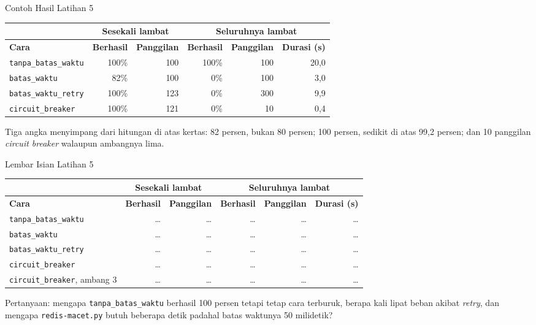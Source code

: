 \documentclass[aspectratio=169, table, 12pt]{beamer}
\begin{document}
\begin{frame}{{\Large Contoh Hasil Latihan 5}}
  \vspace{6pt}
  \centering
  {\small
  \begin{tabularx}{\textwidth}{Xrrrrr}
    \hline
     & \multicolumn{2}{c}{\textbf{Sesekali lambat}} & \multicolumn{3}{c}{\textbf{Seluruhnya lambat}} \\
    \hline
    \textbf{Cara} & \textbf{Berhasil} & \textbf{Panggilan} & \textbf{Berhasil} & \textbf{Panggilan} & \textbf{Durasi (s)} \\
    \hline
    \texttt{tanpa\_batas\_waktu} & 100\% & 100 & 100\% & 100 & 20,0 \\
    \hline
    \texttt{batas\_waktu} & 82\% & 100 & 0\% & 100 & 3,0 \\
    \hline
    \texttt{batas\_waktu\_retry} & 100\% & 123 & 0\% & 300 & 9,9 \\
    \hline
    \texttt{circuit\_breaker} & 100\% & 121 & 0\% & 10 & 0,4 \\
    \hline
  \end{tabularx}}

  \vspace{8pt}
  {\footnotesize Tiga angka menyimpang dari hitungan di atas kertas: 82 persen,
  bukan 80 persen; 100 persen, sedikit di atas 99,2 persen; dan 10 panggilan
  \textit{circuit breaker} walaupun ambangnya lima.}
\end{frame}

\begin{frame}{{\Large Lembar Isian Latihan 5}}
  \vspace{4pt}
  \centering
  {\footnotesize
  \begin{tabularx}{\textwidth}{Xrrrrr}
    \hline
     & \multicolumn{2}{c}{\textbf{Sesekali lambat}} & \multicolumn{3}{c}{\textbf{Seluruhnya lambat}} \\
    \hline
    \textbf{Cara} & \textbf{Berhasil} & \textbf{Panggilan} & \textbf{Berhasil} & \textbf{Panggilan} & \textbf{Durasi (s)} \\
    \hline
    \texttt{tanpa\_batas\_waktu} & \dots & \dots & \dots & \dots & \dots \\
    \hline
    \texttt{batas\_waktu} & \dots & \dots & \dots & \dots & \dots \\
    \hline
    \texttt{batas\_waktu\_retry} & \dots & \dots & \dots & \dots & \dots \\
    \hline
    \texttt{circuit\_breaker} & \dots & \dots & \dots & \dots & \dots \\
    \hline
    \texttt{circuit\_breaker}, ambang 3 & \dots & \dots & \dots & \dots & \dots \\
    \hline
  \end{tabularx}}

  \vspace{6pt}
  {\footnotesize Pertanyaan: mengapa \texttt{tanpa\_batas\_waktu} berhasil 100
  persen tetapi tetap cara terburuk, berapa kali lipat beban akibat
  \textit{retry}, dan mengapa \texttt{redis-macet.py} butuh beberapa detik padahal
  batas waktunya 50 milidetik?}
\end{frame}
\end{document}

